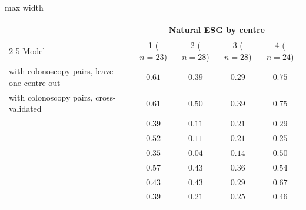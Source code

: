 \begin{table}[!htbp]
\vspace{0.6em}
\begin{adjustbox}{max width=\linewidth}
\begin{tabular}{l cccc}
\toprule
 & \multicolumn{4}{c}{Natural ESG by centre} \\
\cmidrule(lr){2-5}
Model & 1 ($n = 23$) & 2 ($n = 28$) & 3 ($n = 28$) & 4 ($n = 24$) \\
\midrule
\msp{} with colonoscopy pairs, leave-one-centre-out & $0.61$ & $0.39$ & $0.29$ & $0.75$ \\
\msp{} with colonoscopy pairs, cross-validated & $0.61$ & $0.50$ & $0.39$ & $0.75$ \\
\ms{} & $0.39$ & $0.11$ & $0.21$ & $0.29$ \\
\msp{} & $0.52$ & $0.11$ & $0.21$ & $0.25$ \\
\base{} & $0.35$ & $0.04$ & $0.14$ & $0.50$ \\
\gem{} & $0.57$ & $0.43$ & $0.36$ & $0.54$ \\
\opus{} & $0.43$ & $0.43$ & $0.29$ & $0.67$ \\
\gpt{} & $0.39$ & $0.21$ & $0.25$ & $0.46$ \\
\bottomrule
\end{tabular}
\end{adjustbox}
\end{table}

